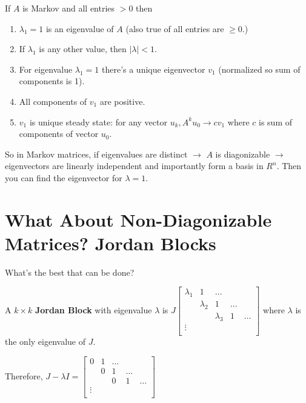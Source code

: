 \begin{theorem} If $A$ is Markov and all entries $>0$ then
\begin{enumerate}
\item $\lambda_1 = 1$ is an eigenvalue of $A$ (also true of all entries are $\geq 0$.)
\item If $\lambda_1$ is any other value, then $|\lambda|<1$.
\item For eigenvalue $\lambda_1 = 1$ there's a unique eigenvector $v_1$ (normalized so sum of components is 1).
\item All components of $v_1$ are positive.
\item $v_1$ is unique steady state: for any vector $u_k, A^ku_0\rightarrow cv_1$ where $c$ is sum of components of vector $u_0$.
\end{enumerate}
\end{theorem}

So in Markov matrices, if eigenvalues are distinct $\rightarrow$ $A$ is diagonizable $\rightarrow$ eigenvectors are linearly independent and importantly form a basis in $R^n$. Then you can find the eigenvector for $\lambda = 1$.

\section{What About Non-Diagonizable Matrices? Jordan Blocks}
What's the best that can be done?
\begin{definition} A $k \times k$ \textbf{Jordan Block} with eigenvalue $\lambda$ is $J\begin{bmatrix}
    \lambda_1 & 1 & \hdots \\  & \lambda_2 & 1 & \hdots \\ & & \lambda_3 & 1 & \hdots\\  \vdots \\
\end{bmatrix}$ where $\lambda$ is the only eigenvalue of $J$.
\end{definition}

Therefore, $J-\lambda I = \begin{bmatrix}
    0 & 1 & \hdots \\  & 0 & 1 & \hdots \\ & & 0 & 1 & \hdots\\  \vdots \\
\end{bmatrix}$

